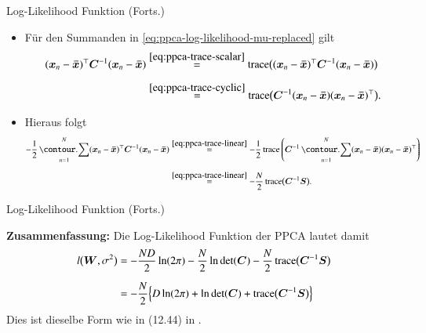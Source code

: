 \begin{frame}{Log-Likelihood Funktion (Forts.)}{}
	\begin{itemize}
		\item Für den Summanden in \eqref{eq:ppca-log-likelihood-mu-replaced} gilt
		\begin{equation}
			\begin{aligned}
				(\bx_n - \bxmean)^\top \bC^{-1} (\bx_n - \bxmean)
					&\overset{\eqref{eq:ppca-trace-scalar}}{=} \trace\bigl( (\bx_n - \bxmean)^\top \bC^{-1} (\bx_n - \bxmean) \bigr)
			\\[2mm]
					&\overset{\eqref{eq:ppca-trace-cyclic}}{=} \trace\bigl( \bC^{-1} (\bx_n - \bxmean) (\bx_n - \bxmean)^\top \bigr).
			\end{aligned}
		\end{equation}
		\item Hieraus folgt
		\begin{equation}
			\begin{aligned}
				-\frac{1}{2} \sum_{n=1}^N (\bx_n - \bxmean)^\top \bC^{-1} (\bx_n - \bxmean)
					&\overset{\eqref{eq:ppca-trace-linear}}{=} -\frac{1}{2} \trace\left(
						\bC^{-1} \sum_{n=1}^N (\bx_n - \bxmean) (\bx_n - \bxmean)^\top
					\right)
			\\[2mm]
					&\overset{\eqref{eq:ppca-trace-linear}}{=} -\frac{N}{2} \trace\bigl( \bC^{-1} \bS \bigr).
			\end{aligned}
		\end{equation}
	\end{itemize}
\end{frame}


\begin{frame}{Log-Likelihood Funktion (Forts.)}{}
	\begin{boxGray}
		\textbf{Zusammenfassung:} Die Log-Likelihood Funktion der PPCA lautet damit
		\begin{equation} \label{eq:ppca-log-likelihood-final}
			\begin{aligned}
				l\bigl( \bm{W}, \sigma^2 \bigr)
					&= -\frac{ND}{2} \ln(2 \pi) - \frac{N}{2} \ln \det(\bm{C}) - \frac{N}{2} \operatorname{\text{trace}}\bigl( \bm{C}^{-1} \bm{S} \bigr)
			\\[2mm]
					&= -\frac{N}{2} \Bigl\{ D \ln(2 \pi) + \ln \det(\bm{C}) + \operatorname{\text{trace}}\bigl( \bm{C}^{-1} \bm{S} \bigr) \Bigr\}
			\end{aligned}
		\end{equation}
		Dies ist dieselbe Form wie in (12.44) in \cite{Bishop2006}.
	\end{boxGray}
\end{frame}


